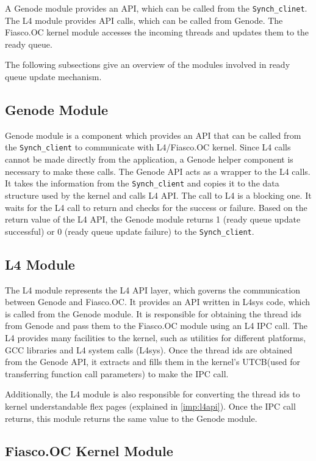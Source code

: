 A Genode module provides an API, which can be called from the \texttt{Synch\_clinet}. The L4 module provides API calls, which can be called from Genode. The Fiasco.OC kernel module accesses the incoming threads and updates them to the ready queue.

The following subsections give an overview of the modules involved in ready queue update mechanism.

\subsection{Genode Module}
Genode module is a component which provides an API that can be called from the \texttt{Synch\_client} to communicate with L4/Fiasco.OC kernel. Since L4 calls cannot be made directly from the application, a Genode helper component is necessary to make these calls. The Genode API acts as a wrapper to the L4 calls. It takes the information from the \texttt{Synch\_client} and copies it to the data structure used by the kernel and calls L4 API. The call to L4 is a blocking one. It waits for the L4 call to return and checks for the success or failure. Based on the return value of the L4 API, the Genode module returns 1 (ready queue update successful) or 0 (ready queue update failure) to the \texttt{Synch\_client}.

\subsection{L4 Module}

The L4 module represents the L4 API layer, which governs the communication between Genode and Fiasco.OC. It provides an API written in L4sys code, which is called from the Genode module. It is responsible for obtaining the thread ids from Genode and pass them to the Fiasco.OC module using an L4 IPC call. The L4 provides many facilities to the kernel, such as utilities for different platforms, GCC libraries and L4 system calls (L4sys). Once the thread ids are obtained from the Genode API, it extracts and fills them in the kernel's UTCB(used for transferring function call parameters) to make the IPC call.

Additionally, the L4 module is also responsible for converting the thread ids to kernel understandable flex pages (explained in \ref{imp:l4api}). Once the IPC call returns, this module returns the same value to the Genode module. 

\subsection{Fiasco.OC Kernel Module}

